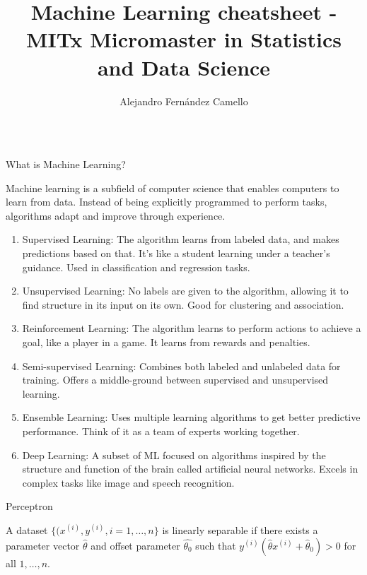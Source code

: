 \documentclass{beamer}
\title{Machine Learning cheatsheet - MITx Micromaster in Statistics and Data Science}
\author{Alejandro Fernández Camello}
\date{\vspace{-100pt}}
\begin{document}
\begin{frame}

\maketitle

\begin{columns}

\begin{column}{0.3\textwidth}
\begin{block}{What is Machine Learning?}

Machine learning is a subfield of computer science that enables computers to learn from data. Instead of being explicitly programmed to perform tasks, algorithms adapt and improve through experience. 

\begin{enumerate}
    \item Supervised Learning: The algorithm learns from labeled data, and makes predictions based on that. It's like a student learning under a teacher's guidance. Used in classification and regression tasks.
    \item Unsupervised Learning: No labels are given to the algorithm, allowing it to find structure in its input on its own. Good for clustering and association.
    \item Reinforcement Learning: The algorithm learns to perform actions to achieve a goal, like a player in a game. It learns from rewards and penalties.
    \item Semi-supervised Learning: Combines both labeled and unlabeled data for training. Offers a middle-ground between supervised and unsupervised learning.
    \item Ensemble Learning: Uses multiple learning algorithms to get better predictive performance. Think of it as a team of experts working together.
    \item Deep Learning: A subset of ML focused on algorithms inspired by the structure and function of the brain called artificial neural networks. Excels in complex tasks like image and speech recognition.
\end{enumerate}
    
\end{block}

\begin{block}{Perceptron}

A dataset $\{ (x^{(i)},y^{(i)}, i = 1, \dots , n\}$ is linearly separable if there exists a parameter vector $\hat{\theta}$ and offset parameter $\hat{\theta_0}$ such that $y^{(i)}(\hat{\theta} x^{(i)} + \hat{\theta}_0) > 0$ for all $1, \dots, n$.


\end{block}
\end{column}
\end{columns}
\end{frame}
\end{document}
